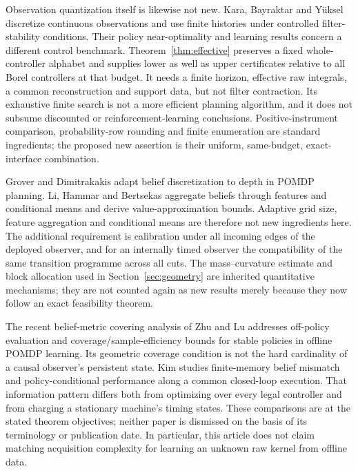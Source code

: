Observation quantization itself is likewise not new. Kara, Bayraktar and Y\"uksel\cite{continuous} discretize continuous observations and use finite histories under controlled filter-stability conditions. Their policy near-optimality and learning results concern a different control benchmark. Theorem~\ref{thm:effective} preserves a fixed whole-controller alphabet and supplies lower as well as upper certificates relative to all Borel controllers at that budget. It needs a finite horizon, effective raw integrals, a common reconstruction and support data, but not filter contraction. Its exhaustive finite search is not a more efficient planning algorithm, and it does not subsume discounted or reinforcement-learning conclusions. Positive-instrument comparison, probability-row rounding and finite enumeration are standard ingredients; the proposed new assertion is their uniform, same-budget, exact-interface combination.

Grover and Dimitrakakis\cite{grover} adapt belief discretization to depth in POMDP planning. Li, Hammar and Bertsekas\cite{li} aggregate beliefs through features and conditional means and derive value-approximation bounds. Adaptive grid size, feature aggregation and conditional means are therefore not new ingredients here. The additional requirement is calibration under all incoming edges of the deployed observer, and for an internally timed observer the compatibility of the same transition programme across all cuts. The mass--curvature estimate and block allocation used in Section~\ref{sec:geometry} are inherited quantitative mechanisms\cite{prior}; they are not counted again as new results merely because they now follow an exact feasibility theorem.

The recent belief-metric covering analysis of Zhu and Lu\cite{zhu} addresses off-policy evaluation and coverage/sample-efficiency bounds for stable policies in offline POMDP learning. Its geometric coverage condition is not the hard cardinality of a causal observer's persistent state. Kim\cite{kim} studies finite-memory belief mismatch and policy-conditional performance along a common closed-loop execution. That information pattern differs both from optimizing over every legal controller and from charging a stationary machine's timing states. These comparisons are at the stated theorem objectives; neither paper is dismissed on the basis of its terminology or publication date. In particular, this article does not claim matching acquisition complexity for learning an unknown raw kernel from offline data.

